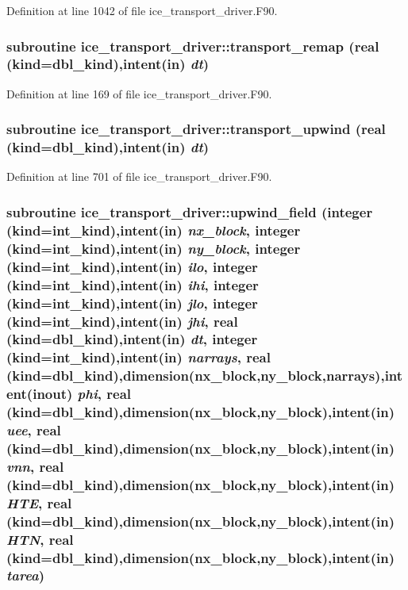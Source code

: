 Definition at line 1042 of file ice\_\-transport\_\-driver.F90.\hypertarget{namespaceice__transport__driver_aaca5fc744c83b022ee5b5117300cbe8c}{
\subsubsection[{transport\_\-remap}]{\setlength{\rightskip}{0pt plus 5cm}subroutine ice\_\-transport\_\-driver::transport\_\-remap (real (kind=dbl\_\-kind),intent(in) {\em dt})}}
\label{namespaceice__transport__driver_aaca5fc744c83b022ee5b5117300cbe8c}


Definition at line 169 of file ice\_\-transport\_\-driver.F90.\hypertarget{namespaceice__transport__driver_ac2fc3fdbf27d4f17ac32c18011940121}{
\subsubsection[{transport\_\-upwind}]{\setlength{\rightskip}{0pt plus 5cm}subroutine ice\_\-transport\_\-driver::transport\_\-upwind (real (kind=dbl\_\-kind),intent(in) {\em dt})}}
\label{namespaceice__transport__driver_ac2fc3fdbf27d4f17ac32c18011940121}


Definition at line 701 of file ice\_\-transport\_\-driver.F90.\hypertarget{namespaceice__transport__driver_acb90f49777dc049ce780454b1165ed0a}{
\subsubsection[{upwind\_\-field}]{\setlength{\rightskip}{0pt plus 5cm}subroutine ice\_\-transport\_\-driver::upwind\_\-field (integer (kind=int\_\-kind),intent(in) {\em nx\_\-block}, \/  integer (kind=int\_\-kind),intent(in) {\em ny\_\-block}, \/  integer (kind=int\_\-kind),intent(in) {\em ilo}, \/  integer (kind=int\_\-kind),intent(in) {\em ihi}, \/  integer (kind=int\_\-kind),intent(in) {\em jlo}, \/  integer (kind=int\_\-kind),intent(in) {\em jhi}, \/  real (kind=dbl\_\-kind),intent(in) {\em dt}, \/  integer (kind=int\_\-kind),intent(in) {\em narrays}, \/  real (kind=dbl\_\-kind),dimension(nx\_\-block,ny\_\-block,narrays),intent(inout) {\em phi}, \/  real (kind=dbl\_\-kind),dimension(nx\_\-block,ny\_\-block),intent(in) {\em uee}, \/  real (kind=dbl\_\-kind),dimension(nx\_\-block,ny\_\-block),intent(in) {\em vnn}, \/  real (kind=dbl\_\-kind),dimension(nx\_\-block,ny\_\-block),intent(in) {\em HTE}, \/  real (kind=dbl\_\-kind),dimension(nx\_\-block,ny\_\-block),intent(in) {\em HTN}, \/  real (kind=dbl\_\-kind),dimension(nx\_\-block,ny\_\-block),intent(in) {\em tarea})}}
\label{namespaceice__transport__driver_acb90f49777dc049ce780454b1165ed0a}


